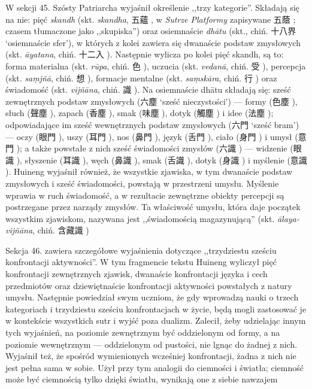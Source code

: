 W sekcji 45. Szósty Patriarcha wyjaśnił określenie ,,trzy kategorie''.
Składają się na nie: pięć \textit{skandh} (skt. \textit{skandha}, 五蘊 , w \textit{Sutrze Platformy} zapisywane 五蔭 ; czasem tłumaczone jako ,,skupiska'') oraz osiemnaście \textit{dhātu} (skt., chiń. 十八界  `osiemnaście sfer'), w których z kolei zawiera się dwanaście podstaw zmysłowych (skt. \nohyphens{\itshape āyatana}, chiń. 十二入 ).
Następnie wylicza po kolei pięć skandh, są to: forma materialna (skt. \textit{rūpa}, chiń. 色 ), uczucia (skt. \textit{vedanā}, chiń. 受 ), percepcja (skt. \textit{sa\d{m}jñā}, chiń. 想 ), formacje mentalne (skt. \textit{sa\d{m}skāra}, chiń. 行 ) oraz świadomość (skt. \textit{vijñāna}, chiń. 識 ).
Na osiemnaście dhātu składają się: sześć zewnętrznych podstaw zmysłowych (六塵 `sześć nieczystości')
--- formy (色塵 ), słuch (聲塵 ), zapach (香塵 ), smak (味塵 ), dotyk (觸塵 ) i idee (法塵 );
odpowiadające im sześć wewnętrznych podstaw zmysłowych (六門  `sześć bram') --- oczy (眼門 ), uszy (耳門 ), nos (鼻門 ), język (舌門 ), ciało (身門 ) i umysł (意門 );
a także powstałe z nich sześć świadomości zmysłów (六識 ) --- widzenie (眼識 ), słyszenie (耳識 ), węch (鼻識 ), smak (舌識 ), dotyk (身識 ) i myślenie (意識 ).
Huineng wyjaśnił również, że wszystkie zjawiska, w tym dwanaście podstaw zmysłowych i sześć świadomości, powstają w przestrzeni umysłu.
Myślenie wprawia w ruch świadomość, a w rezultacie zewnętrzne obiekty percepcji są postrzegane przez narządy zmysłów.
Ta właściwość umysłu, która daje początek wszystkim zjawiskom, nazywana jest ,,świadomością magazynującą'' (skt. \textit{ālaya-vijñāna}, chiń. 含藏識 )\ibid

Sekcja 46. zawiera szczegółowe wyjaśnienia dotyczące ,,trzydziestu sześciu konfrontacji aktywności''. W tym fragmencie tekstu Huineng wyliczył pięć konfrontacji zewnętrznych zjawisk, dwanaście konfrontacji języka i cech przedmiotów oraz dziewiętnaście konfrontacji aktywności powstałych z natury umysłu.
Następnie powiedział swym uczniom, że gdy wprowadzą nauki o trzech kategoriach i trzydziestu sześciu konfrontacjach w życie, będą mogli zastosować je w kontekście wszystkich sutr i wyjść poza dualizm.
Zalecił, żeby udzielając innym tych wyjaśnień, na poziomie zewnętrznym być oddzielonym od formy, a na poziomie wewnętrznym --- oddzielonym od pustości, nie lgnąc do żadnej z nich.
Wyjaśnił też, że spośród wymienionych wcześniej konfrontacji, żadna z nich nie jest pełna sama w sobie.
Użył przy tym analogii do ciemności i światła; ciemność może być ciemnością tylko dzięki światłu, wynikają one z siebie nawzajem\ibid


